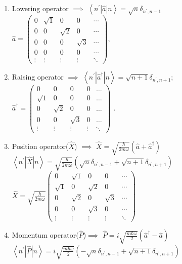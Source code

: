 \begin{enumerate}
 	\item  Lowering operator $\implies$
 	$
 	\left\langle n^{\prime}|\hat{a}| n\right\rangle=\sqrt{n} \delta_{n^{\prime}, n-1}
 	$\\
 	$
 	\hat{a}=\left(\begin{array}{ccccc}
 	0 & \sqrt{1} & 0 & 0 & \cdots \\
 	0 & 0 & \sqrt{2} & 0 & \cdots \\
 	0 & 0 & 0 & \sqrt{3} & \cdots \\
 	0 & 0 & 0 & 0 & \cdots \\
 	\vdots & \vdots & \vdots & \vdots & \ddots
 	\end{array}\right) \text {, }
 	$
 	\item Raising operator $\implies$
 	$\left\langle n^{\prime}\left|\hat{a}^{\dagger}\right| n\right\rangle=\sqrt{n+1} \delta_{n^{\prime}, n+1} ;$ \\
 	$\hat{a}^{\dagger}=\left(\begin{array}{ccccc}
 	0 & 0 & 0 & 0 & \ldots \\
 	\sqrt{1} & 0 & 0 & 0 & \ldots \\
 	0 & \sqrt{2} & 0 & 0 & \ldots \\
 	0 & 0 & \sqrt{3} & 0 & \ldots \\
 	\vdots & \vdots & \vdots & \vdots & \ddots
 	\end{array}\right)$ .
 	\item Position operator($\hat{X}$) $\implies$
 	$\hat{X}=\sqrt{\frac{\hbar}{2 m \omega}}\left(\hat{a}+\hat{a}^{\dagger}\right)$\\
 	$\left\langle n^{\prime}|\hat{X}| n\right\rangle=\sqrt{\frac{\hbar}{2 m \omega}}\left(\sqrt{n} \delta_{n^{\prime}, n-1}+\sqrt{n+1} \delta_{n^{\prime}, n+1}\right)$\\
 	$\hat{X}=\sqrt{\frac{\hbar}{2 m \omega}}\left(\begin{array}{ccccc}
 		0 & \sqrt{1} & 0 & 0 & \cdots \\
 		\sqrt{1} & 0 & \sqrt{2} & 0 & \cdots \\
 		0 & \sqrt{2} & 0 & \sqrt{3} & \cdots \\
 		0 & 0 & \sqrt{3} & 0 & \cdots \\
 		\vdots & \vdots & \vdots & \vdots & \ddots
 	\end{array}\right)$
 	\item Momentum operator($\hat{P}$)$\implies$
 	$\hat{P}=i \sqrt{\frac{m \hbar \omega}{2}}\left(\hat{a}^{\dagger}-\hat{a}\right)$\\
 	$\left\langle n^{\prime}|\hat{P}| n\right\rangle=i \sqrt{\frac{m \hbar \omega}{2}}\left(-\sqrt{n} \delta_{n^{\prime}, n-1}+\sqrt{n+1} \delta_{n^{\prime}, n+1}\right)$\\

\end{enumerate}
